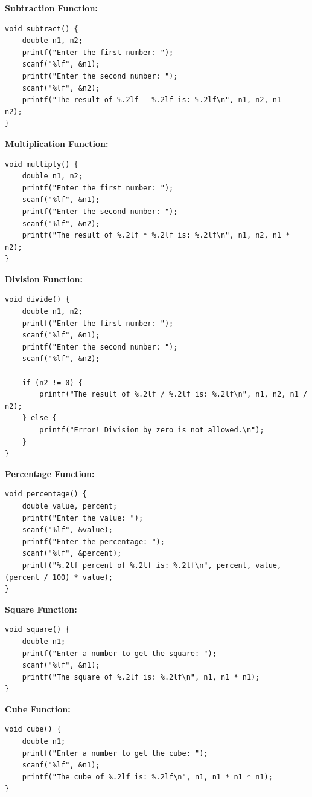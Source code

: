 \documentclass[a4paper,12pt]{article}
\begin{document}
\noindent \textbf{Subtraction Function:}
\begin{verbatim}
void subtract() {
    double n1, n2;
    printf("Enter the first number: ");
    scanf("%lf", &n1);
    printf("Enter the second number: ");
    scanf("%lf", &n2);
    printf("The result of %.2lf - %.2lf is: %.2lf\n", n1, n2, n1 - n2);
}
\end{verbatim}

\noindent \textbf{Multiplication Function:}
\begin{verbatim}
void multiply() {
    double n1, n2;
    printf("Enter the first number: ");
    scanf("%lf", &n1);
    printf("Enter the second number: ");
    scanf("%lf", &n2);
    printf("The result of %.2lf * %.2lf is: %.2lf\n", n1, n2, n1 * n2);
}
\end{verbatim}

\noindent \textbf{Division Function:}
\begin{verbatim}
void divide() {
    double n1, n2;
    printf("Enter the first number: ");
    scanf("%lf", &n1);
    printf("Enter the second number: ");
    scanf("%lf", &n2);
    
    if (n2 != 0) {
        printf("The result of %.2lf / %.2lf is: %.2lf\n", n1, n2, n1 / n2);
    } else {
        printf("Error! Division by zero is not allowed.\n");
    }
}
\end{verbatim}

\newpage

\noindent \textbf{Percentage Function:}
\begin{verbatim}
void percentage() {
    double value, percent;
    printf("Enter the value: ");
    scanf("%lf", &value);
    printf("Enter the percentage: ");
    scanf("%lf", &percent);
    printf("%.2lf percent of %.2lf is: %.2lf\n", percent, value, (percent / 100) * value);
}
\end{verbatim}

\noindent \textbf{Square Function:}
\begin{verbatim}
void square() {
    double n1;
    printf("Enter a number to get the square: ");
    scanf("%lf", &n1);
    printf("The square of %.2lf is: %.2lf\n", n1, n1 * n1);
}
\end{verbatim}

\noindent \textbf{Cube Function:}
\begin{verbatim}
void cube() {
    double n1;
    printf("Enter a number to get the cube: ");
    scanf("%lf", &n1);
    printf("The cube of %.2lf is: %.2lf\n", n1, n1 * n1 * n1);
}
\end{verbatim}
\end{document}
